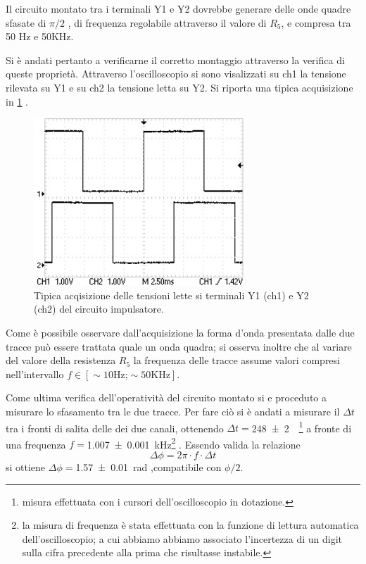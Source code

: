 Il circuito montato tra i terminali Y1 e Y2 dovrebbe generare delle onde quadre sfasate di $\pi/2$ , di frequenza regolabile attraverso il valore di $R_{5}$, e  compresa tra 50 Hz e 50KHz.

Si è andati pertanto a verificarne il corretto montaggio attraverso la verifica di queste proprietà.
Attraverso l'oscilloscopio si sono visalizzati su ch1 la tensione rilevata su Y1 e su  ch2 la tensione letta su Y2. Si riporta una tipica acquisizione in 
\figurename{ \ref{f:oscil} }.
\begin{figure}[htb]
	\includegraphics[scale=0.50]{../Figs-Tabs/ondaquadra_esempio.png}
	\caption{Tipica acqisizione delle tensioni lette si terminali Y1 (ch1) e Y2 (ch2) del circuito impulsatore.}
	\label{f:oscil}
\end{figure}

Come è possibile osservare dall'acquisizione la forma d'onda presentata dalle due tracce può essere trattata quale un onda quadra; si osserva inoltre che al variare del valore della resistenza $R_{5}$ la frequenza delle tracce assume valori compresi nell'intervallo $f\in [\sim 10 \text{Hz;} \sim 50 \text{KHz}]$.

Come ultima verifica dell'operatività del circuito montato si e proceduto a misurare lo sfasamento tra le due tracce.
Per fare ciò si è andati a misurare il $\Delta t$ tra i fronti di salita delle dei due canali, ottenendo $\Delta t=$\SI{248 \pm 2}{\mu \sec}\footnote{misura effettuata con i cursori dell'oscilloscopio in dotazione.} a fronte di una frequenza
$f=$\SI{1.007 \pm 0.001}{\kilo \hertz}\footnote{la misura di frequenza è stata effettuata con la funzione di lettura automatica dell'oscilloscopio; a cui abbiamo abbiamo associato l'incertezza di un digit sulla cifra precedente alla prima che risultasse instabile. } .
Essendo valida la relazione \begin{equation}
\Delta \phi = 2 \pi \cdot f \cdot \Delta t
\end{equation}\label{eq:sfas}
si ottiene $\Delta \phi=$\SI{1.57 \pm 0.01 }{\radian} ,compatibile con $\phi/2$.

